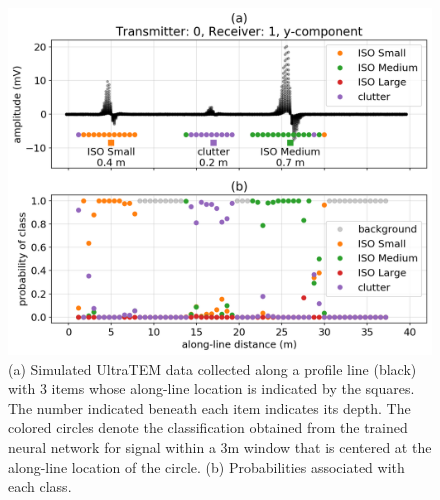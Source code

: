 \begin{figure}[htb]
    \begin{center}
    \includegraphics[width=\columnwidth]{figures/profile-line.png}
    \end{center}
\caption{
    (a) Simulated UltraTEM data collected along a profile line (black) with 3 items whose along-line location is indicated by the squares.
    The number indicated beneath each item indicates its depth.
    The colored circles denote the classification obtained from the trained neural network for signal within a 3m window that is centered at the along-line location of the circle.
    (b) Probabilities associated with each class.
}
\label{fig:profile-line}
\end{figure}
